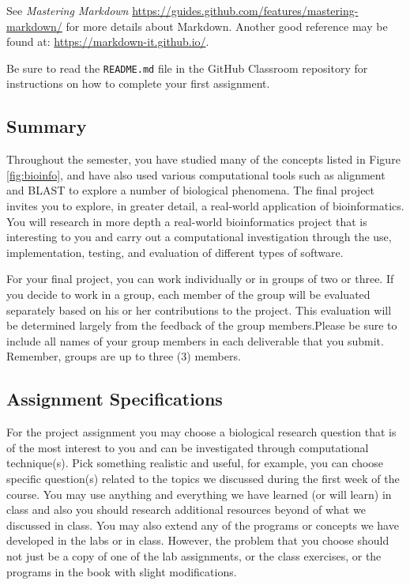 See \emph{Mastering Markdown}  \url{https://guides.github.com/features/mastering-markdown/} for more details about Markdown. Another good reference may be found at: \url{https://markdown-it.github.io/}. 


Be sure to read the {\tt README.md} file in the GitHub Classroom repository for instructions on how to complete your first assignment.

\vspace*{-.1in}
\subsection*{Summary}
\vspace*{-.1in}

Throughout the semester, you have studied many of the concepts listed in Figure \ref{fig:bioinfo}, and have also used various computational tools such as alignment and BLAST to explore a number of biological phenomena. The final project invites you to explore, in greater detail, a real-world application of bioinformatics. You will research in more depth a real-world bioinformatics project that is interesting to you and carry out a computational investigation through the use, implementation, testing, and evaluation of different types of software.

\noindent For your final project, you can work individually or in groups of two or three. If you decide to work in a group, each member of the group will be evaluated separately based on his or her contributions to the project. This evaluation will be determined largely from the feedback of the group members.Please be sure to include all names of your group members in each deliverable that you submit. Remember, groups are up to three (3) members. 

\vspace*{-.1in}
\subsection*{Assignment Specifications}
\vspace*{-.1in}

For the project assignment you may choose a biological research question that is of the most interest to you and can be investigated through computational technique(s). Pick something realistic and useful, for example, you can choose specific question(s) related to the topics we discussed during the first week of the course. You may use anything and everything we have learned (or will learn) in class and also you should research additional resources beyond of what we discussed in class. You may also extend any of the programs or concepts we have developed in the labs or in class. However, the problem that you choose should not just be a copy of one of the lab assignments, or the class exercises, or the programs in the book with slight modifications.

